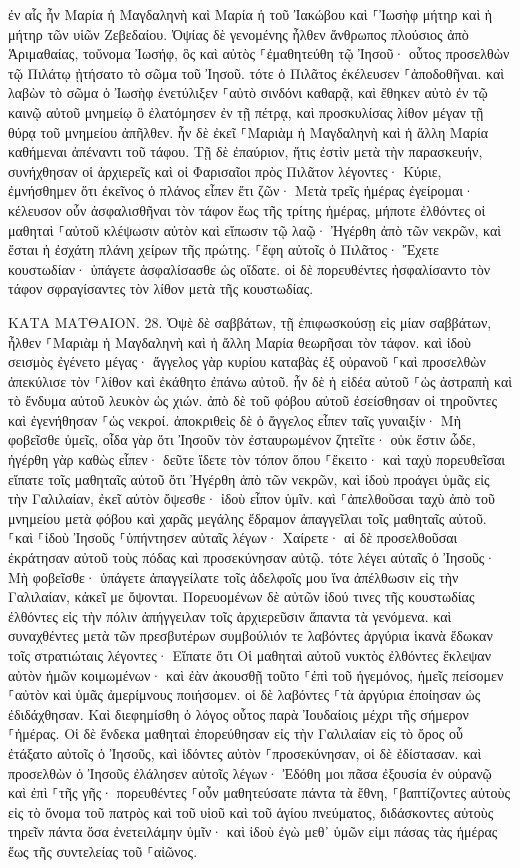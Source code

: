 \documentclass[twoside, 9pt]{extreport}
\begin{document}
ἐν αἷς ἦν Μαρία ἡ Μαγδαληνὴ καὶ Μαρία ἡ τοῦ Ἰακώβου καὶ ⸀Ἰωσὴφ μήτηρ καὶ ἡ μήτηρ τῶν υἱῶν Ζεβεδαίου. 
Ὀψίας δὲ γενομένης ἦλθεν ἄνθρωπος πλούσιος ἀπὸ Ἁριμαθαίας, τοὔνομα Ἰωσήφ, ὃς καὶ αὐτὸς ⸀ἐμαθητεύθη τῷ Ἰησοῦ· 
οὗτος προσελθὼν τῷ Πιλάτῳ ᾐτήσατο τὸ σῶμα τοῦ Ἰησοῦ. τότε ὁ Πιλᾶτος ἐκέλευσεν ⸀ἀποδοθῆναι. 
καὶ λαβὼν τὸ σῶμα ὁ Ἰωσὴφ ἐνετύλιξεν ⸀αὐτὸ σινδόνι καθαρᾷ, 
καὶ ἔθηκεν αὐτὸ ἐν τῷ καινῷ αὐτοῦ μνημείῳ ὃ ἐλατόμησεν ἐν τῇ πέτρᾳ, καὶ προσκυλίσας λίθον μέγαν τῇ θύρᾳ τοῦ μνημείου ἀπῆλθεν. 
ἦν δὲ ἐκεῖ ⸀Μαριὰμ ἡ Μαγδαληνὴ καὶ ἡ ἄλλη Μαρία καθήμεναι ἀπέναντι τοῦ τάφου. 
Τῇ δὲ ἐπαύριον, ἥτις ἐστὶν μετὰ τὴν παρασκευήν, συνήχθησαν οἱ ἀρχιερεῖς καὶ οἱ Φαρισαῖοι πρὸς Πιλᾶτον 
λέγοντες· Κύριε, ἐμνήσθημεν ὅτι ἐκεῖνος ὁ πλάνος εἶπεν ἔτι ζῶν· Μετὰ τρεῖς ἡμέρας ἐγείρομαι· 
κέλευσον οὖν ἀσφαλισθῆναι τὸν τάφον ἕως τῆς τρίτης ἡμέρας, μήποτε ἐλθόντες οἱ μαθηταὶ ⸀αὐτοῦ κλέψωσιν αὐτὸν καὶ εἴπωσιν τῷ λαῷ· Ἠγέρθη ἀπὸ τῶν νεκρῶν, καὶ ἔσται ἡ ἐσχάτη πλάνη χείρων τῆς πρώτης. 
⸀ἔφη αὐτοῖς ὁ Πιλᾶτος· Ἔχετε κουστωδίαν· ὑπάγετε ἀσφαλίσασθε ὡς οἴδατε. 
οἱ δὲ πορευθέντες ἠσφαλίσαντο τὸν τάφον σφραγίσαντες τὸν λίθον μετὰ τῆς κουστωδίας. 

ΚΑΤΑ ΜΑΤΘΑΙΟΝ.
28.
Ὀψὲ δὲ σαββάτων, τῇ ἐπιφωσκούσῃ εἰς μίαν σαββάτων, ἦλθεν ⸀Μαριὰμ ἡ Μαγδαληνὴ καὶ ἡ ἄλλη Μαρία θεωρῆσαι τὸν τάφον. 
καὶ ἰδοὺ σεισμὸς ἐγένετο μέγας· ἄγγελος γὰρ κυρίου καταβὰς ἐξ οὐρανοῦ ⸀καὶ προσελθὼν ἀπεκύλισε τὸν ⸀λίθον καὶ ἐκάθητο ἐπάνω αὐτοῦ. 
ἦν δὲ ἡ εἰδέα αὐτοῦ ⸀ὡς ἀστραπὴ καὶ τὸ ἔνδυμα αὐτοῦ λευκὸν ὡς χιών. 
ἀπὸ δὲ τοῦ φόβου αὐτοῦ ἐσείσθησαν οἱ τηροῦντες καὶ ἐγενήθησαν ⸀ὡς νεκροί. 
ἀποκριθεὶς δὲ ὁ ἄγγελος εἶπεν ταῖς γυναιξίν· Μὴ φοβεῖσθε ὑμεῖς, οἶδα γὰρ ὅτι Ἰησοῦν τὸν ἐσταυρωμένον ζητεῖτε· 
οὐκ ἔστιν ὧδε, ἠγέρθη γὰρ καθὼς εἶπεν· δεῦτε ἴδετε τὸν τόπον ὅπου ⸀ἔκειτο· 
καὶ ταχὺ πορευθεῖσαι εἴπατε τοῖς μαθηταῖς αὐτοῦ ὅτι Ἠγέρθη ἀπὸ τῶν νεκρῶν, καὶ ἰδοὺ προάγει ὑμᾶς εἰς τὴν Γαλιλαίαν, ἐκεῖ αὐτὸν ὄψεσθε· ἰδοὺ εἶπον ὑμῖν. 
καὶ ⸀ἀπελθοῦσαι ταχὺ ἀπὸ τοῦ μνημείου μετὰ φόβου καὶ χαρᾶς μεγάλης ἔδραμον ἀπαγγεῖλαι τοῖς μαθηταῖς αὐτοῦ. 
⸀καὶ ⸀ἰδοὺ Ἰησοῦς ⸀ὑπήντησεν αὐταῖς λέγων· Χαίρετε· αἱ δὲ προσελθοῦσαι ἐκράτησαν αὐτοῦ τοὺς πόδας καὶ προσεκύνησαν αὐτῷ. 
τότε λέγει αὐταῖς ὁ Ἰησοῦς· Μὴ φοβεῖσθε· ὑπάγετε ἀπαγγείλατε τοῖς ἀδελφοῖς μου ἵνα ἀπέλθωσιν εἰς τὴν Γαλιλαίαν, κἀκεῖ με ὄψονται. 
Πορευομένων δὲ αὐτῶν ἰδού τινες τῆς κουστωδίας ἐλθόντες εἰς τὴν πόλιν ἀπήγγειλαν τοῖς ἀρχιερεῦσιν ἅπαντα τὰ γενόμενα. 
καὶ συναχθέντες μετὰ τῶν πρεσβυτέρων συμβούλιόν τε λαβόντες ἀργύρια ἱκανὰ ἔδωκαν τοῖς στρατιώταις 
λέγοντες· Εἴπατε ὅτι Οἱ μαθηταὶ αὐτοῦ νυκτὸς ἐλθόντες ἔκλεψαν αὐτὸν ἡμῶν κοιμωμένων· 
καὶ ἐὰν ἀκουσθῇ τοῦτο ⸀ἐπὶ τοῦ ἡγεμόνος, ἡμεῖς πείσομεν ⸀αὐτὸν καὶ ὑμᾶς ἀμερίμνους ποιήσομεν. 
οἱ δὲ λαβόντες ⸀τὰ ἀργύρια ἐποίησαν ὡς ἐδιδάχθησαν. Καὶ διεφημίσθη ὁ λόγος οὗτος παρὰ Ἰουδαίοις μέχρι τῆς σήμερον ⸀ἡμέρας. 
Οἱ δὲ ἕνδεκα μαθηταὶ ἐπορεύθησαν εἰς τὴν Γαλιλαίαν εἰς τὸ ὄρος οὗ ἐτάξατο αὐτοῖς ὁ Ἰησοῦς, 
καὶ ἰδόντες αὐτὸν ⸀προσεκύνησαν, οἱ δὲ ἐδίστασαν. 
καὶ προσελθὼν ὁ Ἰησοῦς ἐλάλησεν αὐτοῖς λέγων· Ἐδόθη μοι πᾶσα ἐξουσία ἐν οὐρανῷ καὶ ἐπὶ ⸀τῆς γῆς· 
πορευθέντες ⸀οὖν μαθητεύσατε πάντα τὰ ἔθνη, ⸀βαπτίζοντες αὐτοὺς εἰς τὸ ὄνομα τοῦ πατρὸς καὶ τοῦ υἱοῦ καὶ τοῦ ἁγίου πνεύματος, 
διδάσκοντες αὐτοὺς τηρεῖν πάντα ὅσα ἐνετειλάμην ὑμῖν· καὶ ἰδοὺ ἐγὼ μεθ᾽ ὑμῶν εἰμι πάσας τὰς ἡμέρας ἕως τῆς συντελείας τοῦ ⸀αἰῶνος. 
\end{document}
